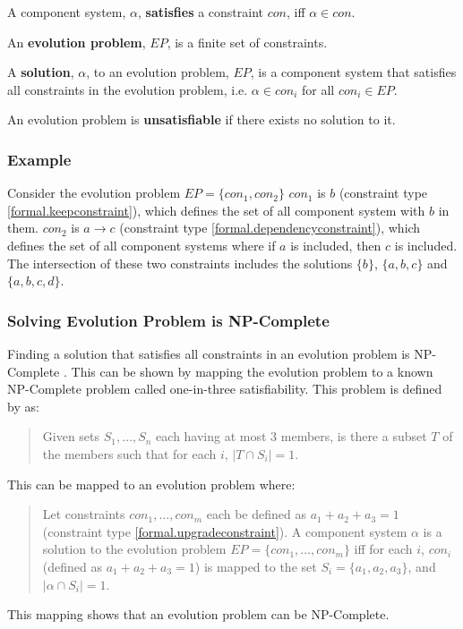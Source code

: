 \begin{defs}
\label{formal.constraintdefs}
A component system, $\alpha$, \textbf{satisfies} a constraint $con$, iff $\alpha \in con$.
\end{defs}

\begin{defs}
An \textbf{evolution problem}, $EP$, is a finite set of constraints.
\end{defs}

\begin{defs}
A \textbf{solution}, $\alpha$, to an evolution problem, $EP$, is a component system that satisfies all constraints in the evolution problem, i.e. $\alpha \in con_i$ for all $con_i \in EP$.  
\end{defs}

\begin{defs}
An evolution problem is \textbf{unsatisfiable} if there exists no solution to it.  
\end{defs}


\subsubsection{Example}
Consider the evolution problem $EP = \{con_1,con_2\}$
$con_1$ is $b$ (constraint type \ref{formal.keepconstraint}), which defines the set of all component system with $b$ in them.
$con_2$ is $a \rightarrow c$ (constraint type \ref{formal.dependencyconstraint}), which defines the set of all component systems where if $a$ is included, then $c$ is included.
The intersection of these two constraints includes the solutions $\{b\}$, $\{a,b,c\}$ and $\{a,b,c,d\}$.

\subsubsection{Solving Evolution Problem is NP-Complete}
Finding a solution that satisfies all constraints in an evolution problem is NP-Complete \citep{cook1971}.
This can be shown by mapping the evolution problem to a known NP-Complete problem called one-in-three satisfiability.
This problem is defined by \cite{Schaefer1978} as:
\begin{quote}
Given sets $S_1, \ldots, S_n$ each having at most 3 members, is there a subset $T$ of the members such that for each $i$, $|T \cap S_i|  =  1$.
\end{quote}

This can be mapped to an evolution problem where:
\begin{quote}
Let constraints $con_1,\ldots,con_m$ each be defined as $a_1 + a_2 + a_3 = 1$ (constraint type \ref{formal.upgradeconstraint}).
A component system $\alpha$ is a solution to the evolution problem $EP = \{con_1,\ldots,con_m\}$ iff for each $i$, 
$con_i$ (defined as $a_1 + a_2 + a_3 = 1$) is mapped to the set $S_i = \{a_1,a_2,a_3\}$, and $|\alpha \cap S_i|  =  1$.
\end{quote}
This mapping shows that an evolution problem can be NP-Complete.

